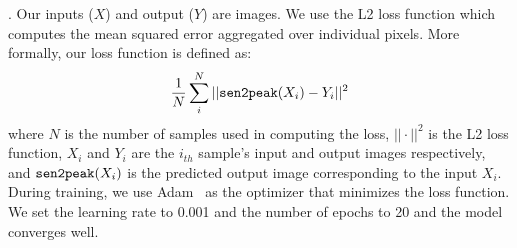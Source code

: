 
. Our inputs ($X$) and output ($Y$) are images. We use the L2 loss function which computes the mean squared error aggregated over individual pixels.
More formally, our loss function is  defined as:
\begin{equation}
 \frac{1}{N} \sum_{i}^{N} || \texttt{sen2peak}(X_i) - Y_i ||^2
 \label{equ:sen2peak_loss}
\end{equation}
where $N$ is the number of samples used in computing the loss, $|| \cdot ||^2$ is the L2 loss function, $X_i$ and $Y_i$ are the $i_{th}$ sample's input and output images respectively, 
and $\texttt{sen2peak}(X_i)$ is the predicted output image corresponding to the input $X_i$. During training, we use 
Adam~\cite{kingma2017adam} as the optimizer that minimizes the loss function. We set the learning rate to 0.001 and the number of epochs to 20 and the model converges well.
